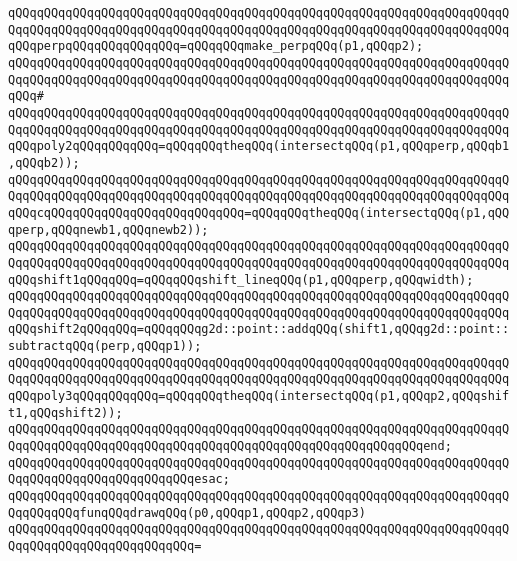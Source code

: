 \verb|qQQqqQQqqQQqqQQqqQQqqQQqqQQqqQQqqQQqqQQqqQQqqQQqqQQqqQQqqQQqqQQqqQQqqQQqqQQqqQQqqQQqqQQqqQQqqQQqqQQqqQQqqQQqqQQqqQQqqQQqqQQqqQQqqQQqqQQqqQQqqQQqperpqQQqqQQqqQQqqQQq=qQQqqQQqmake_perpqQQq(p1,qQQqp2);|\newline
\verb|qQQqqQQqqQQqqQQqqQQqqQQqqQQqqQQqqQQqqQQqqQQqqQQqqQQqqQQqqQQqqQQqqQQqqQQqqQQqqQQqqQQqqQQqqQQqqQQqqQQqqQQqqQQqqQQqqQQqqQQqqQQqqQQqqQQqqQQqqQQqqQQq#|\newline
\verb|qQQqqQQqqQQqqQQqqQQqqQQqqQQqqQQqqQQqqQQqqQQqqQQqqQQqqQQqqQQqqQQqqQQqqQQqqQQqqQQqqQQqqQQqqQQqqQQqqQQqqQQqqQQqqQQqqQQqqQQqqQQqqQQqqQQqqQQqqQQqqQQqpoly2qQQqqQQqqQQq=qQQqqQQqtheqQQq(intersectqQQq(p1,qQQqperp,qQQqb1,qQQqb2));|\newline
\verb|qQQqqQQqqQQqqQQqqQQqqQQqqQQqqQQqqQQqqQQqqQQqqQQqqQQqqQQqqQQqqQQqqQQqqQQqqQQqqQQqqQQqqQQqqQQqqQQqqQQqqQQqqQQqqQQqqQQqqQQqqQQqqQQqqQQqqQQqqQQqqQQqcqQQqqQQqqQQqqQQqqQQqqQQqqQQq=qQQqqQQqtheqQQq(intersectqQQq(p1,qQQqperp,qQQqnewb1,qQQqnewb2));|\newline
\newline
\verb|qQQqqQQqqQQqqQQqqQQqqQQqqQQqqQQqqQQqqQQqqQQqqQQqqQQqqQQqqQQqqQQqqQQqqQQqqQQqqQQqqQQqqQQqqQQqqQQqqQQqqQQqqQQqqQQqqQQqqQQqqQQqqQQqqQQqqQQqqQQqqQQqshift1qQQqqQQq=qQQqqQQqshift_lineqQQq(p1,qQQqperp,qQQqwidth);|\newline
\verb|qQQqqQQqqQQqqQQqqQQqqQQqqQQqqQQqqQQqqQQqqQQqqQQqqQQqqQQqqQQqqQQqqQQqqQQqqQQqqQQqqQQqqQQqqQQqqQQqqQQqqQQqqQQqqQQqqQQqqQQqqQQqqQQqqQQqqQQqqQQqqQQqshift2qQQqqQQq=qQQqqQQqg2d::point::addqQQq(shift1,qQQqg2d::point::subtractqQQq(perp,qQQqp1));|\newline
\newline
\verb|qQQqqQQqqQQqqQQqqQQqqQQqqQQqqQQqqQQqqQQqqQQqqQQqqQQqqQQqqQQqqQQqqQQqqQQqqQQqqQQqqQQqqQQqqQQqqQQqqQQqqQQqqQQqqQQqqQQqqQQqqQQqqQQqqQQqqQQqqQQqqQQqpoly3qQQqqQQqqQQq=qQQqqQQqtheqQQq(intersectqQQq(p1,qQQqp2,qQQqshift1,qQQqshift2));|\newline
\verb|qQQqqQQqqQQqqQQqqQQqqQQqqQQqqQQqqQQqqQQqqQQqqQQqqQQqqQQqqQQqqQQqqQQqqQQqqQQqqQQqqQQqqQQqqQQqqQQqqQQqqQQqqQQqqQQqqQQqqQQqqQQqqQQqend;|\newline
\verb|qQQqqQQqqQQqqQQqqQQqqQQqqQQqqQQqqQQqqQQqqQQqqQQqqQQqqQQqqQQqqQQqqQQqqQQqqQQqqQQqqQQqqQQqqQQqqQQqesac;|\newline
\newline
\verb|qQQqqQQqqQQqqQQqqQQqqQQqqQQqqQQqqQQqqQQqqQQqqQQqqQQqqQQqqQQqqQQqqQQqqQQqqQQqqQQqfunqQQqdrawqQQq(p0,qQQqp1,qQQqp2,qQQqp3)|\newline
\verb|qQQqqQQqqQQqqQQqqQQqqQQqqQQqqQQqqQQqqQQqqQQqqQQqqQQqqQQqqQQqqQQqqQQqqQQqqQQqqQQqqQQqqQQqqQQqqQQq=|\newline
